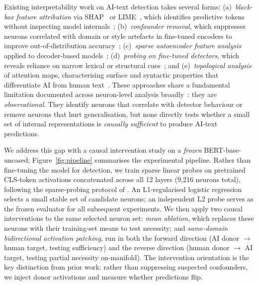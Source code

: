 \documentclass[11pt]{article}
\newcommand{\bertbase}{BERT-base-uncased\xspace}
\begin{document}
Existing interpretability work on AI-text detection takes several forms: (a)~\textit{black-box feature attribution} via SHAP~\citep{lundberg2017shap} or LIME~\citep{ribeiro2016lime}, which identifies predictive tokens without inspecting model internals~\cite{pudasaini2026why}; (b)~\textit{confounder removal}, which suppresses neurons correlated with domain or style artefacts in fine-tuned encoders to improve out-of-distribution accuracy~\cite{borile2025confounding}; (c)~\textit{sparse autoencoder feature analysis} applied to decoder-based models~\cite{kuznetsov2025sae}; (d)~\textit{probing on fine-tuned detectors}, which reveals reliance on narrow lexical or structural cues~\citep{choi2025probing}; and (e)~\textit{topological analysis} of attention maps, characterising surface and syntactic properties that differentiate AI from human text~\citep{kushnareva2021topology}. These approaches share a fundamental limitation documented across neuron-level analysis broadly~\citep{sajjad2022survey}: they are \textit{observational}. They identify neurons that correlate with detector behaviour or remove neurons that hurt generalisation, but none directly tests whether a small set of internal representations is \textit{causally sufficient} to produce AI-text predictions.

We address this gap with a causal intervention study on a \textit{frozen} \bertbase; Figure~\ref{fig:pipeline} summarises the experimental pipeline. Rather than fine-tuning the model for detection, we train sparse linear probes on pretrained CLS-token activations concatenated across all 12 layers (9{,}216 neurons total), following the sparse-probing protocol of \citet{gurnee2023haystack}. An L1-regularised logistic regression selects a small stable set of candidate neurons; an independent L2 probe serves as the frozen evaluator for all subsequent experiments. We then apply two causal interventions to the same selected neuron set: \textit{mean ablation}, which replaces these neurons with their training-set means to test necessity; and \textit{same-domain bidirectional activation patching}, run in both the forward direction (AI donor $\to$ human target, testing sufficiency) and the reverse direction (human donor $\to$ AI target, testing partial necessity on-manifold). The intervention orientation is the key distinction from prior work: rather than suppressing suspected confounders, we inject donor activations and measure whether predictions flip.
\end{document}
